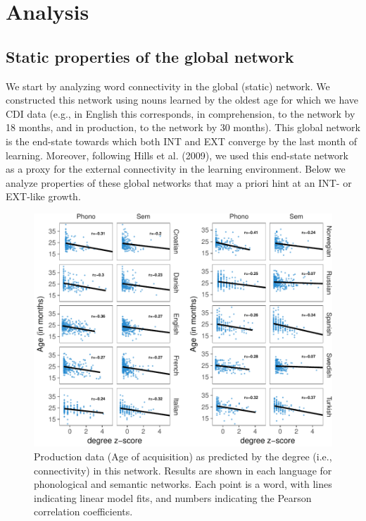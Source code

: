 \documentclass[english,floatsintext,man]{apa6}
\theoremstyle{definition}
\theoremstyle{definition}
\theoremstyle{definition}
\theoremstyle{remark}
\begin{document}
\section{Analysis}\label{analysis}

\subsection{Static properties of the global
network}\label{static-properties-of-the-global-network}

We start by analyzing word connectivity in the global (static) network.
We constructed this network using nouns learned by the oldest age for
which we have CDI data (e.g., in English this corresponds, in
comprehension, to the network by 18 months, and in production, to the
network by 30 months). This global network is the end-state towards
which both INT and EXT converge by the last month of learning. Moreover,
following Hills et al. (2009), we used this end-state network as a proxy
for the external connectivity in the learning environment. Below we
analyze properties of these global networks that may a priori hint at an
INT- or EXT-like growth.

\begin{figure}[!h]
\includegraphics[width=\textwidth]{ms_files/figure-latex/corrProd-1} \caption{Production data (Age of acquisition) as predicted by the degree (i.e., connectivity) in this network. Results are shown in each language for phonological and semantic networks. Each point is a word, with lines indicating linear model fits, and numbers indicating the Pearson correlation coefficients.}\label{fig:corrProd}
\end{figure}
\end{document}
